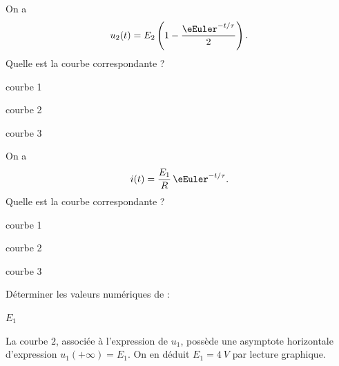 \begin{enonce}
On a 
\[
u_2(t)=E_2\left(1 - \frac{\eEuler^{-t/\tau}}{2} \right).
\]
 Quelle est la courbe correspondante ?
\begin{listeQCM3Colonnes}
\item courbe 1
\item courbe 2
\item courbe 3
\end{listeQCM3Colonnes}
\medskip
\end{enonce}

\reponse{\reponseC}



\begin{enonce}
On a 
\[
i(t)=\frac{E_1}{R}\,\eEuler^{-t/\tau}.
\]
 Quelle est la courbe correspondante ?
\begin{listeQCM3Colonnes}
\item courbe 1
\item courbe 2
\item courbe 3
\end{listeQCM3Colonnes}
\medskip
\end{enonce}

\reponse{\reponseA}


Déterminer les valeurs numériques de : 



\begin{enonce}
$E_1$
\end{enonce}


\begin{corrige}
La courbe $2$, associée à l'expression de $u_1$, possède une asymptote horizontale d'expression $u_1(+\infty) = E_1$. On en déduit $E_1 = \SI{4}{V}$ par lecture graphique.
\end{corrige}




